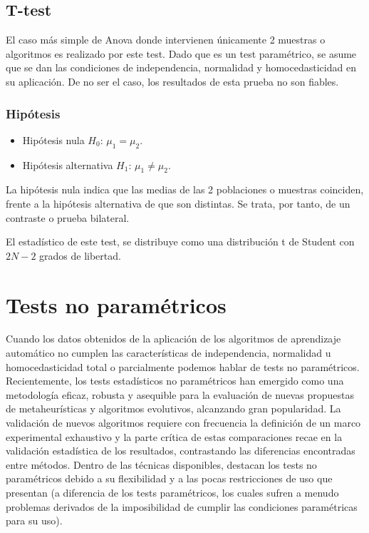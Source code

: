 
\subsection{T-test}
El caso más simple de Anova donde intervienen únicamente 2 muestras o algoritmos es realizado por este test.
Dado que es un test paramétrico, se asume que se dan las condiciones de independencia, normalidad y homocedasticidad
en su aplicación. De no ser el caso, los resultados de esta prueba no son fiables.

\subsubsection{Hipótesis}
\begin{itemize}
\item Hipótesis nula $H_0$: $\mu_1 = \mu_2$.
\item Hipótesis alternativa $H_1$: $\mu_1 \neq \mu_2$.
\end{itemize}
La hipótesis nula indica que las medias de las 2 poblaciones o muestras coinciden, frente a la hipótesis alternativa
de que son distintas. Se trata, por tanto, de un contraste o prueba bilateral.

El estadístico de este test, se distribuye como una distribución t de Student con $2N-2$ grados de libertad.



\section{Tests no paramétricos} \label{no_parametricos}
Cuando los datos obtenidos de la aplicación de los algoritmos de aprendizaje automático no cumplen las
características de independencia, normalidad u homocedasticidad total o parcialmente podemos hablar de tests
no paramétricos. Recientemente, los tests estadísticos no paramétricos han emergido como una metodología
eficaz, robusta y asequible para la evaluación de nuevas propuestas de metaheurísticas y algoritmos evolutivos,
alcanzando gran popularidad. La validación de nuevos algoritmos requiere con frecuencia la definición
de un marco experimental exhaustivo y la parte crítica de estas comparaciones recae en la validación
estadística de los resultados, contrastando las diferencias encontradas entre métodos. Dentro de las técnicas
disponibles, destacan los tests no paramétricos debido a su flexibilidad y a las pocas restricciones de
uso que presentan (a diferencia de los tests paramétricos, los cuales sufren a menudo problemas derivados
de la imposibilidad de cumplir las condiciones paramétricas para su uso). \cite{no_parametricos}

